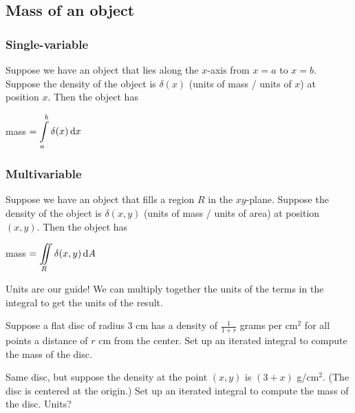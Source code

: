 \vfill 

\pagebreak 

\subsection{Mass of an object}
\subsubsection{Single-variable}
Suppose we have an object that lies along the $x$-axis from $x=a$ to $x=b$. Suppose the density of the object is $\delta(x)$ (units of mass / units of $x$) at position $x$. Then the object has\\
\smallskip 

\noindent mass $= \displaystyle\int\limits_a^b \delta(x)\mathop{}\!\mathrm{d} x$
\vspace{.3in}

\subsubsection{Multivariable}
Suppose we have an object that fills a region $R$ in the $xy$-plane. Suppose the density of the object is $\delta(x,y)$ (units of mass / units of area) at position $(x,y)$. Then the object has \\
\smallskip 

\noindent mass $ = \displaystyle\iint\limits_R \delta(x,y)\mathop{}\!\mathrm{d} A$

\vspace{.3in}
Units are our guide! We can multiply together the units of the terms in the integral to get the units of the result.
\begin{ex}
    Suppose a flat disc of radius 3 cm has a density of $\frac{1}{1+r}$ grams per cm$^2$ for all points a distance of $r$ cm from the center. Set up an iterated integral to compute the mass of the disc.
\end{ex}
\vfill

\begin{ex}
    Same disc, but suppose the density at the point $(x,y)$ is $(3+x)$ g/cm$^2$. (The disc is centered at the origin.) Set up an iterated integral to compute the mass of the disc. Units?
\end{ex}
\vfill 
